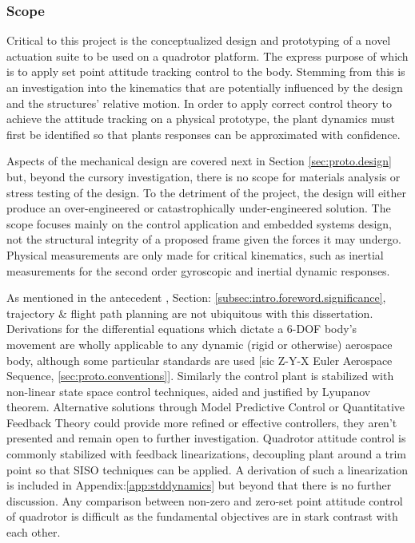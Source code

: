 \subsubsection{Scope}
\label{subsubsec:intro.foreword.scope}
Critical to this project is the conceptualized design and prototyping of a novel actuation suite to be used on a quadrotor platform. The express purpose of which is to apply set point attitude tracking control to the body. Stemming from this is an investigation into the kinematics that are potentially influenced by the design and the structures' relative motion. In order to apply correct control theory to achieve the attitude tracking on a physical prototype, the plant dynamics must first be identified so that plants responses can be approximated with confidence.
\par
Aspects of the mechanical design are covered next in Section \ref{sec:proto.design} but, beyond the cursory investigation, there is no scope for materials analysis or stress testing of the design. To the detriment of the project, the design will either produce an over-engineered or catastrophically under-engineered solution. The scope focuses mainly on the control application and embedded systems design, not the structural integrity of a proposed frame given the forces it may undergo. Physical measurements are only made for critical kinematics, such as inertial measurements for the second order gyroscopic and inertial dynamic responses.
\par
As mentioned in the antecedent , Section: \ref{subsec:intro.foreword.significance}, trajectory \& flight path planning are not ubiquitous with this dissertation. Derivations for the differential equations which dictate a 6-DOF body's movement are wholly applicable to any dynamic (rigid or otherwise) aerospace body, although some particular standards are used [sic Z-Y-X Euler Aerospace Sequence, \ref{sec:proto.conventions}]. Similarly the control plant is stabilized with non-linear state space control techniques, aided and justified by Lyupanov theorem. Alternative solutions through Model Predictive Control or Quantitative Feedback Theory could provide more refined or effective controllers, they aren't presented and remain open to further investigation. Quadrotor attitude control is commonly stabilized with feedback linearizations, decoupling plant around a trim point so that SISO techniques can be applied. A derivation of such a linearization is included in Appendix:\ref{app:stddynamics} but beyond that there is no further discussion. Any comparison between non-zero and zero-set point attitude control of quadrotor is difficult as the fundamental objectives are in stark contrast with each other.
